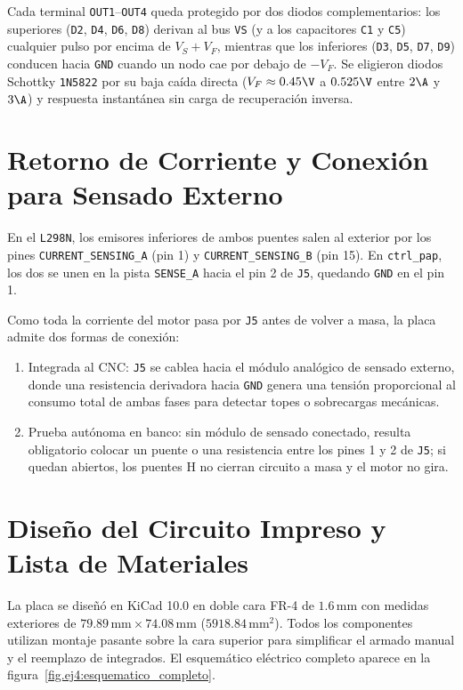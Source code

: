 Cada terminal \texttt{OUT1}--\texttt{OUT4} queda protegido por dos diodos complementarios: los superiores
(\texttt{D2}, \texttt{D4}, \texttt{D6}, \texttt{D8}) derivan al bus \texttt{VS} (y a los capacitores \texttt{C1}
y \texttt{C5}) cualquier pulso por encima de $V_S + V_F$, mientras que los inferiores (\texttt{D3}, \texttt{D5},
\texttt{D7}, \texttt{D9}) conducen hacia \texttt{GND} cuando un nodo cae por debajo de $-V_F$. Se eligieron
diodos Schottky \texttt{1N5822} por su baja caída directa ($V_F \approx 0.45\V$ a $0.525\V$ entre $2\A$ y $3\A$)
y respuesta instantánea sin carga de recuperación inversa.

\section{Retorno de Corriente y Conexión para Sensado Externo}
\label{sec:sensado_corriente}

En el \texttt{L298N}, los emisores inferiores de ambos puentes salen al exterior por los pines
\texttt{CURRENT\_SENSING\_A} (pin 1) y \texttt{CURRENT\_SENSING\_B} (pin 15). En \texttt{ctrl\_pap}, los dos se
unen en la pista \texttt{SENSE\_A} hacia el pin 2 de \texttt{J5}, quedando \texttt{GND} en el pin 1.

Como toda la corriente del motor pasa por \texttt{J5} antes de volver a masa, la placa admite dos formas de
conexión:

\begin{enumerate}
  \item Integrada al CNC: \texttt{J5} se cablea hacia el módulo analógico de sensado externo, donde una
    resistencia derivadora hacia \texttt{GND} genera una tensión proporcional al consumo total de ambas fases para
    detectar topes o sobrecargas mecánicas.
  \item Prueba autónoma en banco: sin módulo de sensado conectado, resulta obligatorio colocar un puente o una
    resistencia entre los pines 1 y 2 de \texttt{J5}; si quedan abiertos, los puentes H no cierran circuito a
    masa y el motor no gira.
\end{enumerate}

\section{Diseño del Circuito Impreso y Lista de Materiales}
\label{sec:diseno_pcb}

La placa se diseñó en KiCad 10.0 en doble cara FR-4 de $1.6\,\unit{\milli\meter}$ con medidas exteriores de
$79.89\,\unit{\milli\meter} \times 74.08\,\unit{\milli\meter}$ ($5918.84\,\unit{\milli\meter\squared}$). Todos los
componentes utilizan montaje pasante sobre la cara superior para simplificar el armado manual y el reemplazo de
integrados. El esquemático eléctrico completo aparece en la figura~\ref{fig.ej4:esquematico_completo}.

